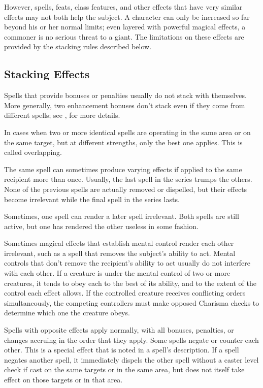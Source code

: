 However, spells, feats, class features, and other effects that have very similar effects may not both help the subject. A character can only be increased so far beyond his or her normal limits; even layered with powerful magical effects, a commoner is no serious threat to a giant. The limitations on these effects are provided by the stacking rules described below.

\subsection{Stacking Effects}
Spells that provide bonuses or penalties usually do not stack with themselves. More generally, two enhancement bonuses don't stack even if they come from different spells; see , for more details.

 In cases when two or more identical spells are operating in the same area or on the same target, but at different strengths, only the best one applies. This is called overlapping.

 The same spell can sometimes produce varying effects if applied to the same recipient more than once. Usually, the last spell in the series trumps the others. None of the previous spells are actually removed or dispelled, but their effects become irrelevant while the final spell in the series lasts.

 Sometimes, one spell can render a later spell irrelevant. Both spells are still active, but one has rendered the other useless in some fashion.

 Sometimes magical effects that establish mental control render each other irrelevant, such as a spell that removes the subject's ability to act. Mental controls that don't remove the recipient's ability to act usually do not interfere with each other. If a creature is under the mental control of two or more creatures, it tends to obey each to the best of its ability, and to the extent of the control each effect allows. If the controlled creature receives conflicting orders simultaneously, the competing controllers must make opposed Charisma checks to determine which one the creature obeys.

 Spells with opposite effects apply normally, with all bonuses, penalties, or changes accruing in the order that they apply. Some spells negate or counter each other. This is a special effect that is noted in a spell's description. If a spell negates another spell, it immediately dispels the other spell without a caster level check if cast on the same targets or in the same area, but does not itself take effect on those targets or in that area.

